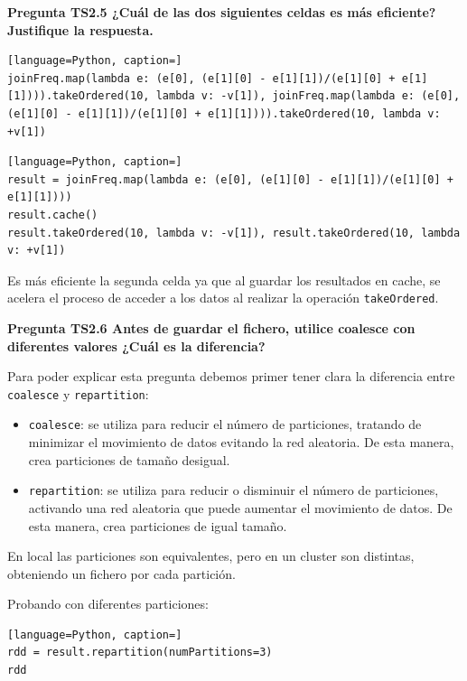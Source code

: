 \documentclass[10pt,swedish, openany]{book}
\begin{document}
\vspace{0.8em}

\textbf{Pregunta TS2.5 ¿Cuál de las dos siguientes celdas es más eficiente? Justifique la respuesta.}

\begin{lstlisting}[language=Python, caption=]
joinFreq.map(lambda e: (e[0], (e[1][0] - e[1][1])/(e[1][0] + e[1][1]))).takeOrdered(10, lambda v: -v[1]), joinFreq.map(lambda e: (e[0], (e[1][0] - e[1][1])/(e[1][0] + e[1][1]))).takeOrdered(10, lambda v: +v[1])
\end{lstlisting}

\begin{lstlisting}[language=Python, caption=]
result = joinFreq.map(lambda e: (e[0], (e[1][0] - e[1][1])/(e[1][0] + e[1][1])))
result.cache()
result.takeOrdered(10, lambda v: -v[1]), result.takeOrdered(10, lambda v: +v[1])
\end{lstlisting}


Es más eficiente la segunda celda ya que al guardar los resultados en cache, se acelera el proceso de acceder a los datos al realizar la operación \texttt{takeOrdered}.
\vspace{0.8em}

\textbf{Pregunta TS2.6 Antes de guardar el fichero, utilice coalesce con diferentes valores ¿Cuál es la diferencia?}

Para poder explicar esta pregunta debemos primer tener clara la diferencia entre \texttt{coalesce} y \texttt{repartition}:

\begin{itemize}
    \item \texttt{coalesce}: se utiliza para reducir el número de particiones, tratando de minimizar el movimiento de datos evitando la red aleatoria. De esta manera, crea particiones de tamaño desigual.
    \item \texttt{repartition}: se utiliza para reducir o disminuir el número de particiones, activando una red aleatoria que puede aumentar el movimiento de datos. De esta manera, crea particiones de igual tamaño.
\end{itemize}


En local las particiones son equivalentes, pero en un cluster son distintas, obteniendo un fichero por cada partición.

Probando con diferentes particiones:

\begin{lstlisting}[language=Python, caption=]
rdd = result.repartition(numPartitions=3)
rdd
\end{lstlisting}
\end{document}
